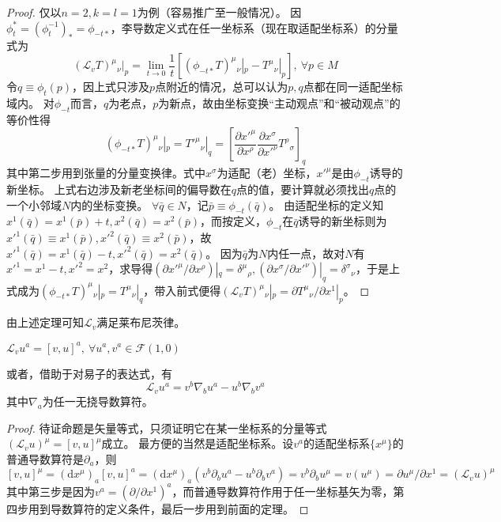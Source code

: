 \begin{proof}
	仅以$n = 2, k = l = 1$为例（容易推广至一般情况）。
	因$\phi_t^* = (\phi_t^{-1})_* = \phi_{-t*}$，李导数定义式在任一坐标系（现在取适配坐标系）的分量式为
	$$(\mathscr{L}_vT)^{\mu}{}_{\nu}|_p = \lim\limits_{t \to 0}\frac{1}{t}[(\phi_{-t*}T)^{\mu}{}_{\nu}|_p - T^{\mu}{}_{\nu}|_p], ~ \forall p \in M$$
	令$q \equiv \phi_t(p)$，因上式只涉及$p$点附近的情况，总可以认为$p, q$点都在同一适配坐标域内。
	对$\phi_{-t}$而言，$q$为老点，$p$为新点，故由坐标变换``主动观点''和``被动观点''的等价性得
	$$(\phi_{-t*}T)^{\mu}{}_{\nu}|_p = T'^{\mu}{}_{\nu}|_q = \left[\frac{\partial x'^{\mu}}{\partial x^{\rho}}\frac{\partial x^{\sigma}}{\partial x'^{\nu}}T^{\rho}{}_{\sigma}\right]_q$$
	其中第二步用到张量的分量变换律。式中$x^{\sigma}$为适配（老）坐标，$x'^{\mu}$是由$\phi_{-t}$诱导的新坐标。
	上式右边涉及新老坐标间的偏导数在$q$点的值，要计算就必须找出$q$点的一个小邻域$N$内的坐标变换。
	$\forall \bar{q} \in N$，记$\bar{p} \equiv \phi_{-t}(\bar{q})$。
	由适配坐标的定义知$x^1(\bar{q}) = x^1(\bar{p}) + t, x^2(\bar{q}) = x^2(\bar{p})$，而按定义，$\phi_{-t}$在$\bar{q}$诱导的新坐标则为$x'^1(\bar{q}) \equiv x^1(\bar{p}), x'^2(\bar{q}) \equiv x^2(\bar{p})$，故$x'^1(\bar{q}) = x^1(\bar{q}) - t, x'^2(\bar{q}) = x^2(\bar{q})$。
	因为$\bar{q}$为$N$内任一点，故对$N$有$x'^1 = x^1 - t, x'^2 = x^2$，求导得$(\partial x'^{\mu} / \partial x^{\rho})|_q = \delta^{\mu}{}_{\rho}, (\partial x^{\sigma} / \partial x'^{\nu})|_q = \delta^{\sigma}{}_{\nu}$，于是上式成为$(\phi_{-t*}T)^{\mu}{}_{\nu}|_p = T^{\mu}{}_{\nu}|_q$，带入前式便得$(\mathscr{L}_vT)^{\mu}{}_{\nu}|_p = \partial T^{\mu}{}_{\nu} / \partial x^1|_p$。
\end{proof}

由上述定理可知$\mathscr{L}_v$满足莱布尼茨律。

\begin{theorem}
	$\mathscr{L}_vu^a = [v, u]^a, ~ \forall u^a, v^a \in \mathscr{F}(1, 0)$

	或者，借助于对易子的表达式，有
	$$\mathscr{L}_vu^a = v^b\nabla_bu^a - u^b\nabla_bv^a$$
	其中$\nabla_a$为任一无挠导数算符。
\end{theorem}

\begin{proof}
	待证命题是矢量等式，只须证明它在某一坐标系的分量等式$(\mathscr{L}_vu)^{\mu} = [v, u]^{\mu}$成立。
	最方便的当然是适配坐标系。设$v^a$的适配坐标系$\{x^\mu\}$的普通导数算符是$\partial_a$，则
	$$[v, u]^\mu = (\mathrm{d}x^\mu)_a[v, u]^a = (\mathrm{d}x^\mu)_a(v^b\partial_bu^a - u^b\partial_bv^a) = v^b\partial_bu^\mu = v(u^\mu) = \partial u^\mu / \partial x^1 = (\mathscr{L}_vu)^\mu$$
	其中第三步是因为$v^a = (\partial / \partial x^1)^a$，而普通导数算符作用于任一坐标基矢为零，第四步用到导数算符的定义条件，最后一步用到前面的定理。
\end{proof}

